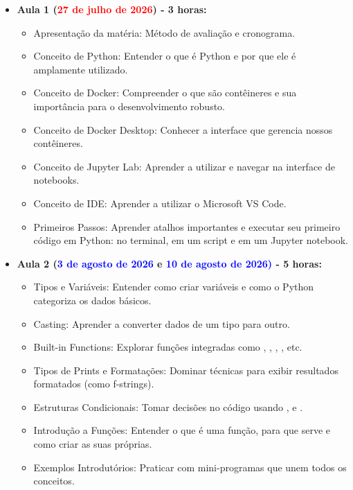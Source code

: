 \begin{itemize}\justifying
    \item \textbf{Aula 1 (\textcolor{red}{27 de julho de 2026}) - 3 horas:}
    \begin{itemize}\justifying
        \item Apresentação da matéria: Método de avaliação e cronograma.
        \item Conceito de Python: Entender o que é Python e por que ele é amplamente utilizado.
        \item Conceito de Docker: Compreender o que são contêineres e sua importância para o desenvolvimento robusto.
        \item Conceito de Docker Desktop: Conhecer a interface que gerencia nossos contêineres.
        \item Conceito de Jupyter Lab: Aprender a utilizar e navegar na interface de notebooks.
        \item Conceito de IDE: Aprender a utilizar o Microsoft VS Code.
        \item Primeiros Passos: Aprender atalhos importantes e executar seu primeiro código em Python: no terminal, em um script e em um Jupyter notebook.        
    \end{itemize}
    
    \item \textbf{Aula 2 (\textcolor{blue}{3 de agosto de 2026} e \textcolor{blue}{10 de agosto de 2026)} - 5 horas:}
    \begin{itemize}\justifying
        \item Tipos e Variáveis: Entender como criar variáveis e como o Python categoriza os dados básicos.
        \item Casting: Aprender a converter dados de um tipo para outro.
        \item Built-in Functions: Explorar funções integradas como , , , , etc.
        \item Tipos de Prints e Formatações: Dominar técnicas para exibir resultados formatados (como f-strings).
        \item Estruturas Condicionais: Tomar decisões no código usando ,  e .
        \item Introdução a Funções: Entender o que é uma função, para que serve e como criar as suas próprias.
        \item Exemplos Introdutórios: Praticar com mini-programas que unem todos os conceitos.
    \end{itemize}
    

\end{itemize}
